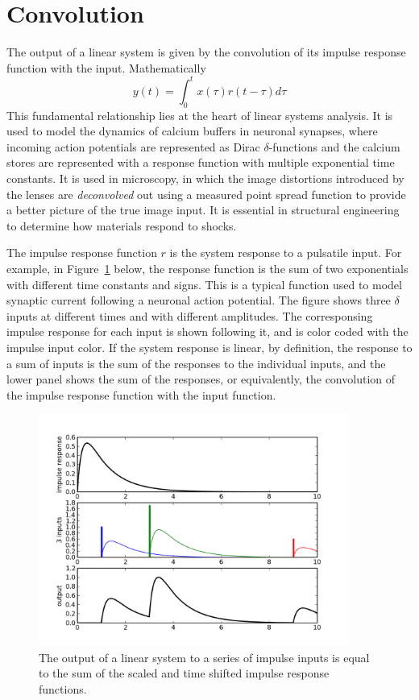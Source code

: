 \section{Convolution}
\label{sec:convolution}

The output of a linear system is given by the convolution of its
impulse response function with the input.  Mathematically
\[
  y(t) = \int_0^t x(\tau)r(t-\tau)d\tau
\]
This fundamental relationship lies at the heart of linear systems
analysis.  It is used to model the dynamics of calcium buffers in
neuronal synapses, where incoming action potentials are represented as
Dirac $\delta$-functions and the calcium stores are represented with a
response function with multiple exponential time constants.  It is
used in microscopy, in which the image distortions introduced by the
lenses are \textit{deconvolved} out using a measured point spread
function to provide a better picture of the true image input.  It is
essential in structural engineering to determine how materials respond
to shocks.

The impulse response function $r$ is the system response to a
pulsatile input.  For example, in Figure~\ref{fig:convolve_explain}
below, the response function is the sum of two exponentials with
different time constants and signs.  This is a typical function used
to model synaptic current following a neuronal action potential.  The
figure shows three $\delta$ inputs at different times and with
different amplitudes.  The corresponsing impulse response for each
input is shown following it, and is color coded with the impulse input
color.  If the system response is linear, by definition, the response
to a sum of inputs is the sum of the responses to the individual
inputs, and the lower panel shows the sum of the responses, or
equivalently, the convolution of the impulse response function with
the input function.

\begin{center}%
\begin{figure}
\begin{centering}\includegraphics[width=4in]{fig/convolve_explain}\par\end{centering}
\caption{\label{fig:convolve_explain}The output of a linear system to
a series of impulse inputs is equal to the sum of the scaled and time
shifted impulse response functions.}
\end{figure}
\par\end{center}

